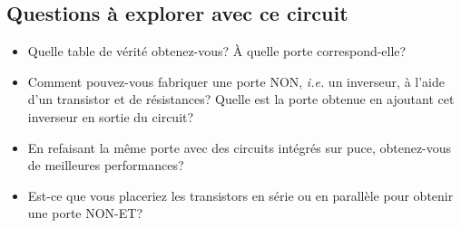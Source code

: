 \documentclass[canadien,12pt,oneside,letterpaper]{article}
\begin{document}
\subsection{Questions à explorer avec ce circuit}
\begin{itemize}
    \item Quelle table de vérité obtenez-vous? À quelle porte correspond-elle? %
    \item Comment pouvez-vous fabriquer une porte NON, \textit{i.e.} un inverseur, à l'aide d'un transistor et de résistances? Quelle est la porte obtenue en ajoutant cet inverseur en sortie du circuit? %
    \item En refaisant la même porte avec des circuits intégrés sur puce, obtenez-vous de meilleures performances? %
    \item Est-ce que vous placeriez les transistors en série ou en parallèle pour obtenir une porte NON-ET?
\end{itemize}
 
\end{document}
